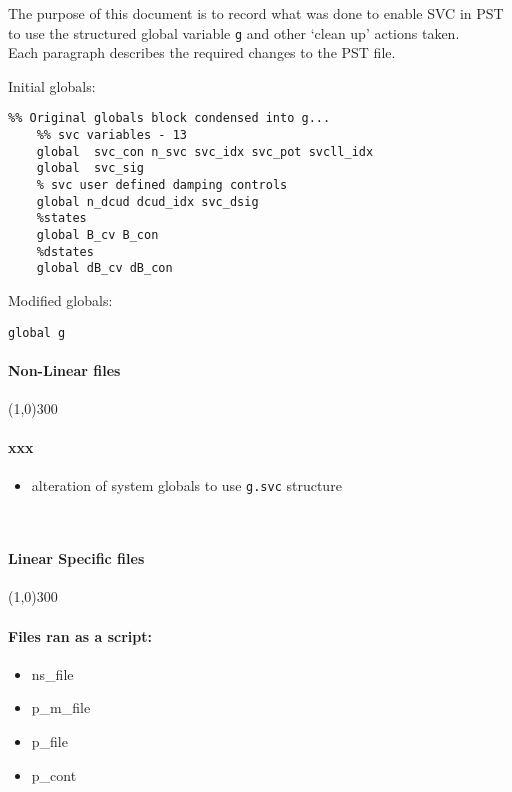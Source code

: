 \documentclass[12pt]{article}
\begin{document}
The purpose of this document is to record what was done to enable SVC in PST to use the structured global variable \verb|g| and other `clean up' actions taken. \\
Each paragraph describes the required changes to the PST file.

Initial globals:
\begin{verbatim}
%% Original globals block condensed into g...
    %% svc variables - 13
    global  svc_con n_svc svc_idx svc_pot svcll_idx
    global  svc_sig
    % svc user defined damping controls
    global n_dcud dcud_idx svc_dsig
    %states
    global B_cv B_con
    %dstates
    global dB_cv dB_con
\end{verbatim}

Modified globals:
\begin{verbatim}
global g
\end{verbatim}
\paragraph{Non-Linear files}\line(1,0){300}
\paragraph{xxx}
	\begin{itemize}
		\item alteration of system globals to use \verb|g.svc| structure
	\end{itemize}
\

\paragraph{Linear Specific files}\line(1,0){300}

\paragraph{Files ran as a script:}
	\begin{itemize}
		\item ns\_file
		\item p\_m\_file
		\item p\_file
		\item p\_cont
	\end{itemize}
	
	
\end{document}
